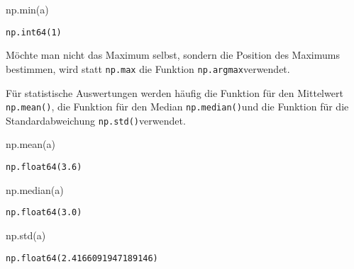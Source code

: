 \documentclass[
  letterpaper,
  DIV=11,
  numbers=noendperiod]{scrreprt}
\newenvironment{Shaded}{\begin{snugshade}}{\end{snugshade}}
\newcommand{\BuiltInTok}[1]{\textcolor[rgb]{0.00,0.23,0.31}{#1}}
\newcommand{\NormalTok}[1]{\textcolor[rgb]{0.00,0.23,0.31}{#1}}
\begin{document}
\begin{tcolorbox}
\begin{Shaded}
\begin{Highlighting}[]
\NormalTok{np.}\BuiltInTok{min}\NormalTok{(a)}
\end{Highlighting}
\end{Shaded}

\begin{verbatim}
np.int64(1)
\end{verbatim}

Möchte man nicht das Maximum selbst, sondern die Position des Maximums
bestimmen, wird statt \texttt{np.max} die Funktion
\texttt{np.argmax}verwendet.

Für statistische Auswertungen werden häufig die Funktion für den
Mittelwert \texttt{np.mean()}, die Funktion für den Median
\texttt{np.median()}und die Funktion für die Standardabweichung
\texttt{np.std()}verwendet.

\begin{Shaded}
\begin{Highlighting}[]
\NormalTok{np.mean(a)}
\end{Highlighting}
\end{Shaded}

\begin{verbatim}
np.float64(3.6)
\end{verbatim}

\begin{Shaded}
\begin{Highlighting}[]
\NormalTok{np.median(a)}
\end{Highlighting}
\end{Shaded}

\begin{verbatim}
np.float64(3.0)
\end{verbatim}

\begin{Shaded}
\begin{Highlighting}[]
\NormalTok{np.std(a)}
\end{Highlighting}
\end{Shaded}

\begin{verbatim}
np.float64(2.4166091947189146)
\end{verbatim}

\begin{tcolorbox}[enhanced jigsaw, breakable, opacityback=0, left=2mm, coltitle=black, leftrule=.75mm, colframe=quarto-callout-tip-color-frame, opacitybacktitle=0.6, toprule=.15mm, bottomtitle=1mm, titlerule=0mm, toptitle=1mm, title=\textcolor{quarto-callout-tip-color}{\faLightbulb}\hspace{0.5em}{Zwischenübung: Rechnen mit Arrays}, colbacktitle=quarto-callout-tip-color!10!white, arc=.35mm, bottomrule=.15mm, rightrule=.15mm, colback=white]


\end{tcolorbox}
\end{tcolorbox}
\end{document}
